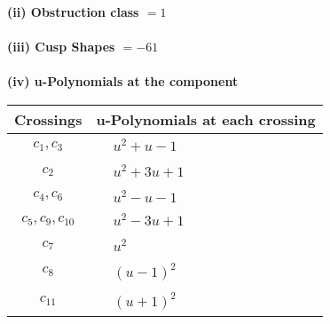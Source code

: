 \documentclass[1p]{elsarticle_modified}
\theoremstyle{definition}
\begin{document}
\flushleft \textbf{(ii) Obstruction class $= 1$}\\~\\
\flushleft \textbf{(iii) Cusp Shapes $= -61$}\\~\\
\newpage\renewcommand{\arraystretch}{1}
\flushleft \textbf{(iv) u-Polynomials at the component}\newline \\
\begin{tabular}{m{50pt}|m{274pt}}
Crossings & \hspace{64pt}u-Polynomials at each crossing \\
\hline $$\begin{aligned}c_{1},c_{3}\end{aligned}$$&$\begin{aligned}
&u^2+u-1
\end{aligned}$\\
\hline $$\begin{aligned}c_{2}\end{aligned}$$&$\begin{aligned}
&u^2+3 u+1
\end{aligned}$\\
\hline $$\begin{aligned}c_{4},c_{6}\end{aligned}$$&$\begin{aligned}
&u^2- u-1
\end{aligned}$\\
\hline $$\begin{aligned}c_{5},c_{9},c_{10}\end{aligned}$$&$\begin{aligned}
&u^2-3 u+1
\end{aligned}$\\
\hline $$\begin{aligned}c_{7}\end{aligned}$$&$\begin{aligned}
&u^2
\end{aligned}$\\
\hline $$\begin{aligned}c_{8}\end{aligned}$$&$\begin{aligned}
&(u-1)^2
\end{aligned}$\\
\hline $$\begin{aligned}c_{11}\end{aligned}$$&$\begin{aligned}
&(u+1)^2
\end{aligned}$\\
\hline
\end{tabular}\\~\\
\end{document}
